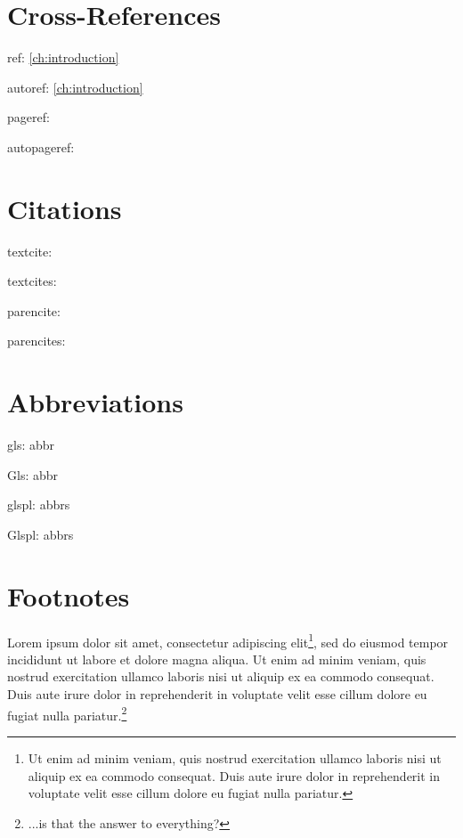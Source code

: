 \newpage

\section*{Cross-References}
\noindent ref: \ref{ch:introduction} %

\noindent autoref: \autoref{ch:introduction} %

\noindent pageref: \pageref{ch:introduction} %

\noindent autopageref:  %


\section*{Citations}
\noindent textcite: \textcite[p. 13]{westfahl:space}

\noindent textcites: \textcites[p. 13]{westfahl:space}{angenendt}[p. 13]{baez/article}

\noindent parencite: \parencite[see][p. 13]{westfahl:space}

\noindent parencites: \parencites(see)(and \autoref{ch:introduction})[p. 13]{westfahl:space}{angenendt}[p. 34]{baez/article}

\section*{Abbreviations}
\noindent gls: \gls{abbr} %

\noindent Gls: \Gls{abbr} %

\noindent glspl: \glspl{abbr} %

\noindent Glspl: \Glspl{abbr} %

\section*{Footnotes}
Lorem ipsum dolor sit amet, consectetur adipiscing elit\footnote{Ut enim ad minim veniam, quis nostrud exercitation ullamco laboris nisi ut aliquip ex ea commodo consequat. Duis aute irure dolor in reprehenderit in voluptate velit esse cillum dolore eu fugiat nulla pariatur.}, sed do eiusmod tempor incididunt ut labore et dolore magna aliqua. Ut enim ad minim veniam, quis nostrud exercitation ullamco laboris nisi ut aliquip ex ea commodo consequat. Duis aute irure dolor in reprehenderit in voluptate velit esse cillum dolore eu fugiat nulla pariatur.\footnote[42]{...is that the answer to everything?}


